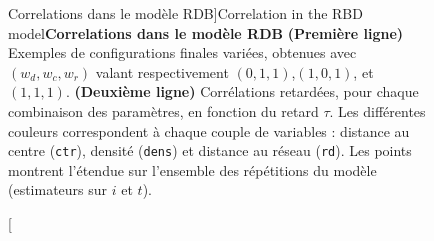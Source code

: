 \begin{figure}
\caption[Correlation in the RBD model][Correlations dans le modèle RDB]{Correlation in the RBD model\label{fig:causalityregimes:exrdb}}{\textbf{Correlations dans le modèle RDB} \textbf{(Première ligne)} Exemples de configurations finales variées, obtenues avec $(w_{d},w_{c},w_{r})$ valant respectivement $(0,1,1)$,$(1,0,1)$, et $(1,1,1)$. \textbf{(Deuxième ligne)} Corrélations retardées, pour chaque combinaison des paramètres, en fonction du retard $\tau$. Les différentes couleurs correspondent à chaque couple de variables : distance au centre (\texttt{ctr}), densité (\texttt{dens}) et distance au réseau (\texttt{rd}). Les points montrent l'étendue sur l'ensemble des répétitions du modèle (estimateurs sur $i$ et $t$).\label{fig:causalityregimes:exrdb}}
\end{figure}



